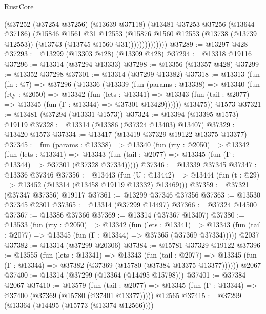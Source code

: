 \begin{lexlean}{RustCore}
\begin{coremodule}
                    (@37252
                      (@37254 @37256)
                      (@13639 @37118)
                      (@13481
                        @37253
                        @37256
                        (@13644 @37186)
                        (@15846
                          @1561
                          @31
                          @12553
                          (@15876
                            @1560
                            @12553
                            (@13738 (@13739 @12553))
                            (@13743 (@13745 @1560 @31))))))))))))))
@37289 := @13297 @428
@37293 := @13299 (@13303 @428) (@13309 @428)
@37294 := @13318 @19116
@37296 := @13314 (@37294 @13333)
@37298 := @13356 (@13357 @428)
@37299 := @13352 @37298
@37301 := @13314 (@37299 @13382)
@37318 := @13313
    (fun (fn : @7) =>
    @37296
      (@13336
        (@13339
          (fun (params : @13338) =>
          @13340
            (fun (rty : @2050) =>
            @13342
              (fun (lets : @13341) =>
              @13343 (fun (tail : @2077) => @13345 (fun (Γ : @13344) => @37301 @13429))))))
        @13475))
    @1573
@37321 := @13481 (@37294 (@13331 @1573))
@37324 := @13394 (@13395 @1573) @19119
@37328 := @13314 (@13386 (@37324 @13403) @13407)
@37329 := @13420 @1573
@37334 := @13417 (@13419 @37329 @19122 @13375 @13377)
@37345 := fun (params : @13338) =>
  @13340
    (fun (rty : @2050) =>
    @13342
      (fun (lets : @13341) =>
      @13343 (fun (tail : @2077) => @13345 (fun (Γ : @13344) => @37301 (@37328 @37334)))))
@37346 := @13339 @37345
@37347 := @13336 @37346
@37356 := @13443
    (fun (U : @13442) => @13444 (fun (t : @29) => @13452 (@13314 (@13458 @19119 @13332) @13469)))
@37359 := @37321 (@37347 @37356) @19117
@37361 := @13299 @37346 @37356
@37363 := @13530 @37345 @2301
@37365 := @13314 (@37299 @14497)
@37366 := @37324 @14500
@37367 := @13386 @37366
@37369 := @13314 (@37367 @13407)
@37380 := @13533
    (fun (rty : @2050) =>
    @13342
      (fun (lets : @13341) =>
      @13343 (fun (tail : @2077) => @13345 (fun (Γ : @13344) => @37365 (@37369 @37334)))))
    @2037
@37382 := @13314 (@37299 @20306)
@37384 := @15781 @37329 @19122
@37396 := @13555
    (fun (lets : @13341) =>
    @13343
      (fun (tail : @2077) =>
      @13345 (fun (Γ : @13344) => @37382 (@37369 (@15780 (@37384 @13375 @13377))))))
    @2067
@37400 := @13314 (@37299 (@13364 (@14495 @15798)))
@37401 := @37384 @2067
@37410 := @13579
    (fun (tail : @2077) => @13345 (fun (Γ : @13344) => @37400 (@37369 (@15780 (@37401 @13377)))))
    @12565
@37415 := @37299 (@13364 (@14495 (@15773 (@13374 @12566))))

\end{coremodule}
\end{lexlean}
